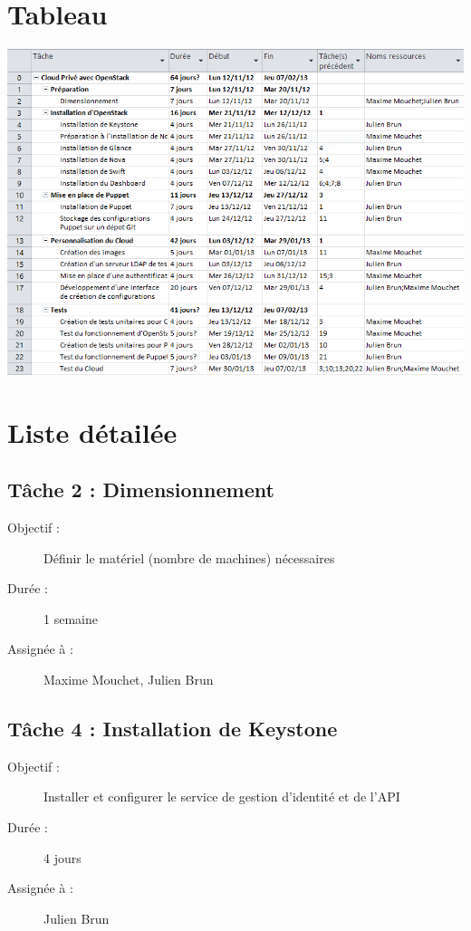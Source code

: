 \section{Tableau}
\includegraphics[width=19cm,angle=90]{images/liste.png}

\section{Liste détailée}
\subsection*{Tâche 2 : Dimensionnement}
\begin{description}
\item[Objectif :] Définir le matériel (nombre de machines) nécessaires
\item[Durée :]  1 semaine
\item[Assignée à :] Maxime Mouchet, Julien Brun
\end{description}

\subsection*{Tâche 4 : Installation de Keystone}
\begin{description}
\item[Objectif :] Installer et configurer le service de gestion d'identité et de l'API
\item[Durée :]  4 jours
\item[Assignée à :] Julien Brun
\end{description}

